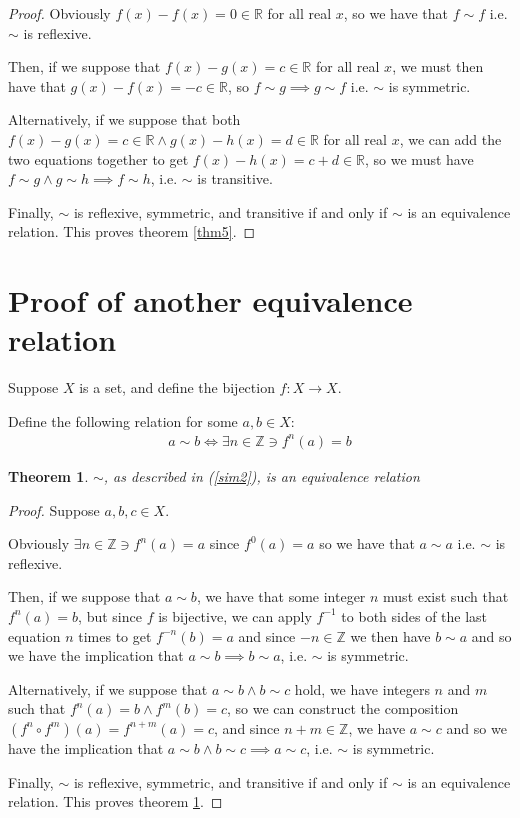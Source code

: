 \documentclass[12pt]{article}
\newcommand{\reals}{\mathbb{R}}
\newcommand{\ints}{\mathbb{Z}}
\newtheorem{thm}{Theorem}
\begin{document}
\begin{proof}
	Obviously $f(x) - f(x) = 0 \in \reals$
	for all real $x$,
	so we have that $f \sim f$
	i.e. $\sim$ is reflexive.

	Then, if we suppose that $f(x) - g(x) = c \in \reals$
	for all real $x$,
	we must then have
	that $g(x) - f(x) = -c \in \reals$,
	so $f \sim g \implies g \sim f$
	i.e. $\sim$ is symmetric.

	Alternatively, if we suppose that both
	$f(x) - g(x) = c \in \reals \land g(x) - h(x) = d \in \reals$
	for all real $x$,
	we can add the two equations together to get
	$f(x) - h(x) = c + d \in \reals$,
	so we must have $f \sim g \land g \sim h \implies f \sim h$,
	i.e. $\sim$ is transitive.

	Finally, $\sim$ is
	reflexive,
	symmetric,
	and transitive
	if and only if
	$\sim$ is an equivalence relation.
	This proves theorem \ref{thm5}.
\end{proof}

\section{Proof of another equivalence relation}

Suppose $X$ is a set,
and define the bijection $f:X \to X$.

Define the following relation for some $a,b \in X$:
\begin{align} \label{sim2}
	a \sim b \iff \exists n \in \ints \ni f^n(a) = b
\end{align}

\begin{thm} \label{thm6}
	$\sim$, as described in (\ref{sim2}), is an equivalence relation
\end{thm}

\begin{proof}
	Suppose $a,b,c \in X$.

	Obviously $\exists n \in \ints \ni f^n(a) = a$
	since $f^0(a) = a$
	so we have that $a \sim a$
	i.e. $\sim$ is reflexive.

	Then, if we suppose that $a \sim b$,
	we have that some integer $n$ must
	exist such that $f^n(a) = b$,
	but since $f$ is bijective, we can apply $f^{-1}$
	to both sides of the last equation $n$ times
	to get $f^{-n}(b) = a$ and since $-n \in \ints$
	we then have $b \sim a$ and so
	we have the implication that
	$a \sim b \implies b \sim a$,
	i.e. $\sim$ is symmetric.

	Alternatively, if we suppose that
	$a \sim b \land b \sim c$ hold,
	we have integers $n$ and $m$ such that
	$f^n(a) = b \land f^m(b) = c$,
	so we can construct the composition
	$(f^n \circ f^m)(a) = f^{n + m}(a) = c$,
	and since $n + m \in \ints$,
	we have $a \sim c$ and so
	we have the implication that
	$a \sim b \land b \sim c \implies a \sim c$,
	i.e. $\sim$ is symmetric.

	Finally, $\sim$ is
	reflexive,
	symmetric,
	and transitive
	if and only if
	$\sim$ is an equivalence relation.
	This proves theorem \ref{thm6}.
\end{proof}
\end{document}
